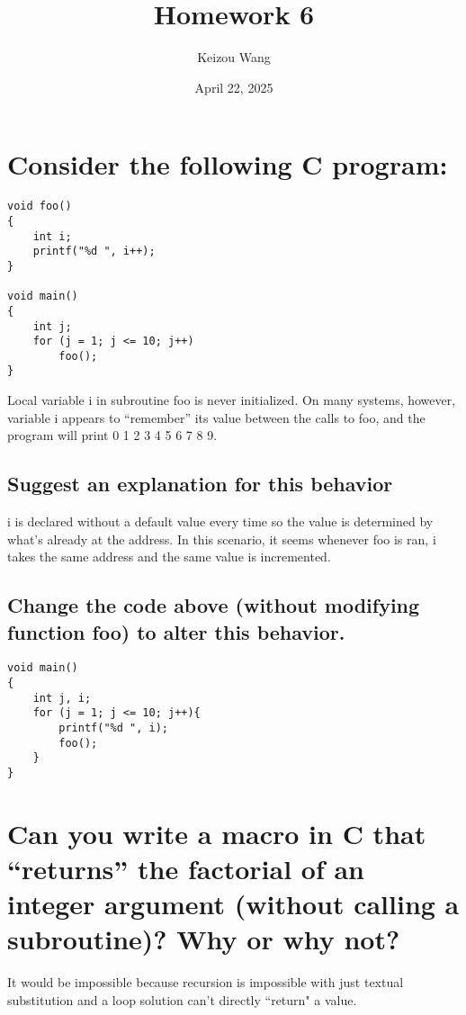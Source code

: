 \documentclass[letterpaper]{article}
\title{Homework 6}
\author{Keizou Wang}
\date{April 22, 2025}
\begin{document}
\maketitle

\section{Consider the following C program:}
\begin{adjustwidth}{2.35em}{0pt}
\begin{lstlisting}
void foo()
{
	int i;
	printf("%d ", i++);
}

void main()
{
	int j;
	for (j = 1; j <= 10; j++)
		foo();
}
\end{lstlisting}
Local variable i in subroutine foo is never initialized. On many systems, however, variable i appears to “remember” its value between the calls to foo, and the program will print 0 1 2 3 4 5 6 7 8 9.
\end{adjustwidth}
\subsection{Suggest an explanation for this behavior}
\begin{adjustwidth}{2.35em}{0pt}
i is declared without a default value every time so the value is determined by what's already at the address. In this scenario, it seems whenever foo is ran, i takes the same address and the same value is incremented.
\end{adjustwidth}
\subsection{Change the code above (without modifying function foo) to alter this behavior.}
\begin{adjustwidth}{2.35em}{0pt}
\begin{lstlisting}
void main()
{
	int j, i;
	for (j = 1; j <= 10; j++){
		printf("%d ", i);
		foo();
	}
}
\end{lstlisting}
\end{adjustwidth}

\section{Can you write a macro in C that “returns” the factorial of an integer argument (without calling a subroutine)? Why or why not?}
\begin{adjustwidth}{2.35em}{0pt}
It would be impossible because recursion is impossible with just textual substitution and a loop solution can't directly ``return" a value.
\end{adjustwidth}
\end{document}
